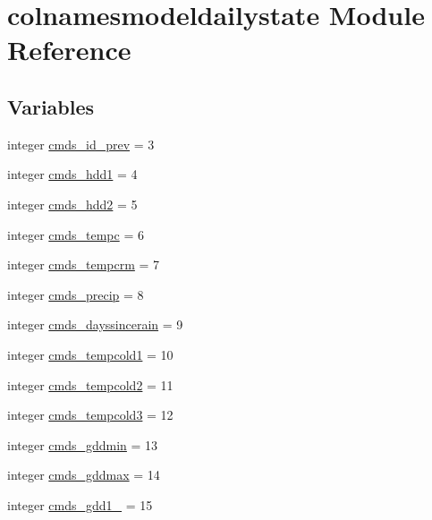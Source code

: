 \hypertarget{namespacecolnamesmodeldailystate}{}\section{colnamesmodeldailystate Module Reference}
\label{namespacecolnamesmodeldailystate}
\subsection*{Variables}
\begin{DoxyCompactItemize}
\item 
integer \hyperlink{namespacecolnamesmodeldailystate_a335cf41e0a1c85c5c2fed9ef1d49f614}{cmds\+\_\+id\+\_\+prev} = 3
\item 
integer \hyperlink{namespacecolnamesmodeldailystate_a066a4d377151c681eaf60edda9bea9f7}{cmds\+\_\+hdd1} = 4
\item 
integer \hyperlink{namespacecolnamesmodeldailystate_aa76bc4be1b7d076d0130aa43bdd879e3}{cmds\+\_\+hdd2} = 5
\item 
integer \hyperlink{namespacecolnamesmodeldailystate_a0c3257aec7f5bbd0c9b19c6ce253b4e9}{cmds\+\_\+tempc} = 6
\item 
integer \hyperlink{namespacecolnamesmodeldailystate_a953f3684887b76a61b94852e3f5af136}{cmds\+\_\+tempcrm} = 7
\item 
integer \hyperlink{namespacecolnamesmodeldailystate_a26b2e557c09f0e303cd47ce11fc6f1fd}{cmds\+\_\+precip} = 8
\item 
integer \hyperlink{namespacecolnamesmodeldailystate_a6862cbb0931e20815992cc1185267c44}{cmds\+\_\+dayssincerain} = 9
\item 
integer \hyperlink{namespacecolnamesmodeldailystate_a0e35922fff6c3bf5f04bcc40a503dff1}{cmds\+\_\+tempcold1} = 10
\item 
integer \hyperlink{namespacecolnamesmodeldailystate_ac8218de315f15aff2dee7df1fd7d9a0a}{cmds\+\_\+tempcold2} = 11
\item 
integer \hyperlink{namespacecolnamesmodeldailystate_ac06601f1cc10c6db54d31dbd32095df6}{cmds\+\_\+tempcold3} = 12
\item 
integer \hyperlink{namespacecolnamesmodeldailystate_abcedf7efc1a3412f948b812e450ed2a5}{cmds\+\_\+gddmin} = 13
\item 
integer \hyperlink{namespacecolnamesmodeldailystate_aa084d67416748ce2d9c312f3adefdbb8}{cmds\+\_\+gddmax} = 14
\item 
integer \hyperlink{namespacecolnamesmodeldailystate_a7d365d809a7adfa1569d1b95c4542c6c}{cmds\+\_\+gdd1\+\_} = 15

\end{DoxyCompactItemize}

